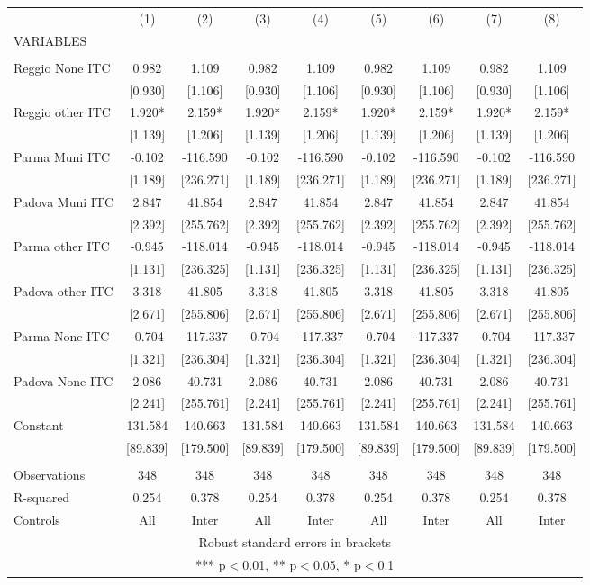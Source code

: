 \begin{tabular}{lcccccccc} \hline
 & (1) & (2) & (3) & (4) & (5) & (6) & (7) & (8) \\
VARIABLES &  &  &  &  &  &  &  &  \\ \hline
 &  &  &  &  &  &  &  &  \\
Reggio None ITC & 0.982 & 1.109 & 0.982 & 1.109 & 0.982 & 1.109 & 0.982 & 1.109 \\
 & [0.930] & [1.106] & [0.930] & [1.106] & [0.930] & [1.106] & [0.930] & [1.106] \\
Reggio other ITC & 1.920* & 2.159* & 1.920* & 2.159* & 1.920* & 2.159* & 1.920* & 2.159* \\
 & [1.139] & [1.206] & [1.139] & [1.206] & [1.139] & [1.206] & [1.139] & [1.206] \\
Parma Muni ITC & -0.102 & -116.590 & -0.102 & -116.590 & -0.102 & -116.590 & -0.102 & -116.590 \\
 & [1.189] & [236.271] & [1.189] & [236.271] & [1.189] & [236.271] & [1.189] & [236.271] \\
Padova Muni ITC & 2.847 & 41.854 & 2.847 & 41.854 & 2.847 & 41.854 & 2.847 & 41.854 \\
 & [2.392] & [255.762] & [2.392] & [255.762] & [2.392] & [255.762] & [2.392] & [255.762] \\
Parma other ITC & -0.945 & -118.014 & -0.945 & -118.014 & -0.945 & -118.014 & -0.945 & -118.014 \\
 & [1.131] & [236.325] & [1.131] & [236.325] & [1.131] & [236.325] & [1.131] & [236.325] \\
Padova other ITC & 3.318 & 41.805 & 3.318 & 41.805 & 3.318 & 41.805 & 3.318 & 41.805 \\
 & [2.671] & [255.806] & [2.671] & [255.806] & [2.671] & [255.806] & [2.671] & [255.806] \\
Parma None ITC & -0.704 & -117.337 & -0.704 & -117.337 & -0.704 & -117.337 & -0.704 & -117.337 \\
 & [1.321] & [236.304] & [1.321] & [236.304] & [1.321] & [236.304] & [1.321] & [236.304] \\
Padova None ITC & 2.086 & 40.731 & 2.086 & 40.731 & 2.086 & 40.731 & 2.086 & 40.731 \\
 & [2.241] & [255.761] & [2.241] & [255.761] & [2.241] & [255.761] & [2.241] & [255.761] \\
Constant & 131.584 & 140.663 & 131.584 & 140.663 & 131.584 & 140.663 & 131.584 & 140.663 \\
 & [89.839] & [179.500] & [89.839] & [179.500] & [89.839] & [179.500] & [89.839] & [179.500] \\
 &  &  &  &  &  &  &  &  \\
Observations & 348 & 348 & 348 & 348 & 348 & 348 & 348 & 348 \\
R-squared & 0.254 & 0.378 & 0.254 & 0.378 & 0.254 & 0.378 & 0.254 & 0.378 \\
 Controls & All & Inter & All & Inter & All & Inter & All & Inter \\ \hline
\multicolumn{9}{c}{ Robust standard errors in brackets} \\
\multicolumn{9}{c}{ *** p$<$0.01, ** p$<$0.05, * p$<$0.1} \\
\end{tabular}
